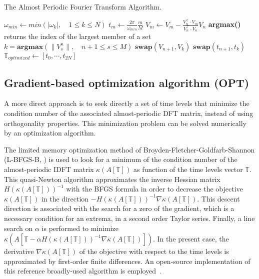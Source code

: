 \begin{algorithm}[htb]
\caption{The Almost Periodic Fourier Transform Algorithm.}
\label{alg:algo_APFT}
\begin{algorithmic}
\STATE $\omega_{min} \leftarrow min \left( |\omega_k |,\quad 1 \leqslant k \leqslant N \right)$
    \STATE $t_m \leftarrow \displaystyle\frac{2\pi}{\omega_{min}}\frac{m}{M}$
\ENDFOR
{}
  \STATE $ V_{m} \leftarrow V_{m} - \displaystyle\frac{V_{n}^\top \cdot V_{m}}{V_{n}^\top \cdot V_{n}} V_{n}$
   \ENDFOR
   \STATE \textbf{argmax()} returns the index of the largest member of a set
   \STATE $k=\textbf{argmax} \left( \| V_s^n \|,\quad n+1\leqslant s \leqslant M\right) $
   \STATE $\textbf{swap}(V_{n+1},V_{k})$
   \STATE $\textbf{swap}(t_{n+1},t_{k})$
\ENDFOR
\STATE $\mathbb{T}_{optimized} \leftarrow [t_0, \cdots, t_{2N}]$
\end{algorithmic}
\end{algorithm}

\subsection{Gradient-based optimization algorithm (OPT)}
A more direct approach is to seek directly a set of time levels
that minimize the condition number of the associated almost-periodic DFT matrix, 
instead of using orthogonality properties. 
This minimization problem can be solved numerically by 
an optimization algorithm. %

The limited memory optimization method of
Broyden-Fletcher-Goldfarb-Shannon (L-BFGS-B, \cite{Byrd94alimited}) is
used to look for a minimum of the condition number of the
almost-periodic IDFT matrix $\kappa \left(A \left[\mathbb{T} \right]
\right)$ as function of the time levels vector $\mathbb{T}$.  This
quasi-Newton algorithm approximates the inverse Hessian matrix
$H(\kappa \left(A \left[\mathbb{T} \right] \right))^{-1}$ with the
BFGS formula in order to decrease the objective $\kappa \left(A
  \left[\mathbb{T} \right] \right)$ in the direction $-H(\kappa
\left(A \left[\mathbb{T} \right] \right))^{-1}\nabla \kappa \left(A
  \left[\mathbb{T} \right] \right)$.  This descent direction is
associated with the search for a zero of the gradient, which is a
necessary condition for an extrema, in a second order Taylor series.
Finally, a line search on $\alpha$ is performed to minimize $\kappa
\left(A \left[\mathbb{T} - \alpha H(\kappa \left(A \left[\mathbb{T}
      \right] \right))^{-1} \nabla \kappa \left(A \left[\mathbb{T}
      \right] \right) \right] \right)$.  In the present case, the
derivative $\nabla \kappa \left(A \left[\mathbb{T} \right] \right)$ of
the objective with respect to the time levels is approximated by
first-order finite differences.  An open-source implementation of this
reference broadly-used algorithm is
employed~\cite{Nocedal97lbfgsb}.

